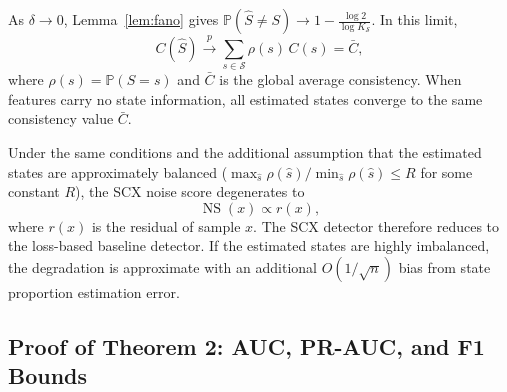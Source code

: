 \begin{corollary}
\label{cor:global-consistency}
As $\delta \to 0$, Lemma~\ref{lem:fano} gives
$\mathbb{P}(\hat{S} \neq S) \to 1 - \frac{\log 2}{\log K_{\mathcal{S}}}$.
In this limit,
\[
C(\hat{S}) \xrightarrow{p} \sum_{s \in \mathcal{S}} \rho(s)\, C(s) = \bar{C},
\]
where $\rho(s) = \mathbb{P}(S = s)$ and $\bar{C}$ is the global average
consistency. When features carry no state information, all estimated states
converge to the same consistency value $\bar{C}$.
\end{corollary}

\begin{corollary}
\label{cor:ns-degradation}
Under the same conditions and the additional assumption that the estimated
states are approximately balanced
($\max_{\hat{s}} \rho(\hat{s}) / \min_{\hat{s}} \rho(\hat{s}) \leq R$ for
some constant $R$), the SCX noise score degenerates to
\[
\operatorname{NS}(x) \propto r(x),
\]
where $r(x)$ is the residual of sample $x$. The SCX detector therefore
reduces to the loss-based baseline detector. If the estimated states are
highly imbalanced, the degradation is approximate with an additional
$O(1/\sqrt{n})$ bias from state proportion estimation error.
\end{corollary}

\subsection{Proof of Theorem 2: AUC, PR-AUC, and F1 Bounds}
\label{sec:thm2:proof}

